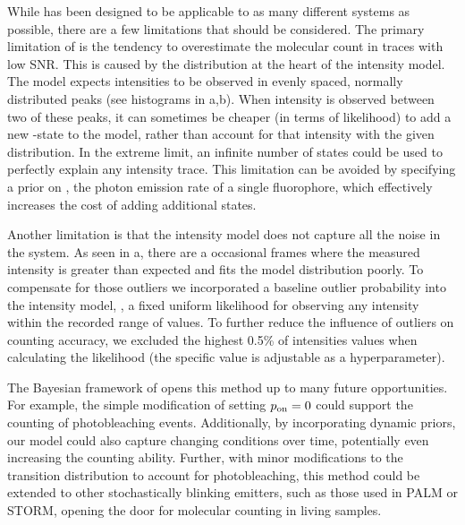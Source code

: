 While \ours has been designed to be applicable to as many different systems as
possible, there are a few limitations that should be considered.
  The primary limitation of \ours is the tendency to overestimate the molecular
  count in traces with low SNR.
  This is caused by the distribution at the heart of the intensity model. 
  The model expects intensities to be observed in evenly spaced, normally
  distributed peaks (see histograms in a,b).
  When intensity is observed between two of these peaks, it can sometimes be
  cheaper (in terms of likelihood) to add a new \z{}-state to the model, rather
  than account for that intensity with the given distribution.
  In the extreme limit, an infinite number of states could be used to perfectly
  explain any intensity trace.
  This limitation can be avoided by specifying a prior on \re, the photon
  emission rate of a single fluorophore, which effectively increases the cost
  of adding additional states.

Another limitation is that the intensity model does not capture all the noise
in the system.
    As seen in a, there are a occasional
    frames where the measured intensity is greater than expected and 
    fits the model distribution poorly.
    To compensate for those outliers we incorporated a baseline outlier
    probability into the intensity model, \ie, a fixed uniform likelihood for
    observing any intensity within the recorded range of values.
    To further reduce the influence of outliers on counting accuracy, we
    excluded the highest 0.5\% of intensities values when calculating the
    likelihood (the specific value is adjustable as a hyperparameter).

The Bayesian framework of \ours opens this method up to many future 
opportunities.
    For example, the simple modification of setting $p_\text{on}=0$ could support the
    counting of photobleaching events.
    Additionally, by incorporating dynamic priors, our model could also capture
    changing conditions over time, potentially even increasing the counting
    ability.
    Further, with minor modifications to the transition distribution to account
    for photobleaching, this method could be extended to other stochastically
    blinking emitters, such as those used in PALM or STORM, opening the door
    for molecular counting in living samples.
    
